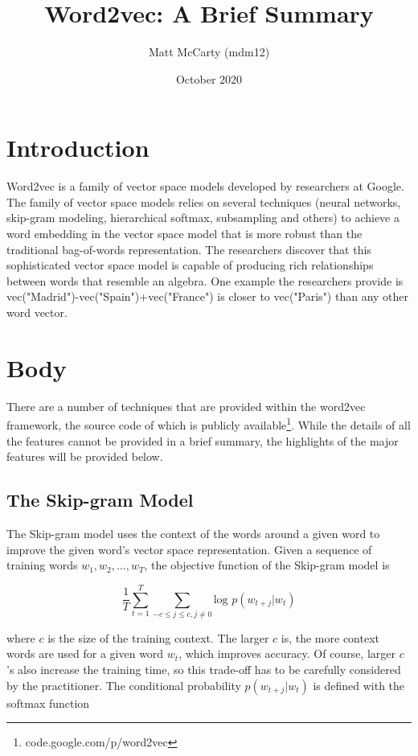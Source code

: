 \documentclass[12pt]{article}
\begin{document}
\title{Word2vec: A Brief Summary}
\author{Matt McCarty (mdm12)}
\date{October 2020}
\maketitle

\section{Introduction}

Word2vec is a family of vector space models developed by researchers at Google.\cite{source1} The family of vector space models relies on several techniques (neural networks, skip-gram modeling, hierarchical softmax, subsampling and others) to achieve a word embedding in the vector space model that is more robust than the traditional bag-of-words representation.\cite{source2} The researchers discover that this sophisticated vector space model is capable of producing rich relationships between words that resemble an algebra. One example the researchers provide is vec("Madrid")-vec("Spain")+vec("France") is closer to vec("Paris") than any other word vector.\cite{source3}

\section{Body}

There are a number of techniques that are provided within the word2vec framework, the source code of which is publicly available\footnote{\label{foot1}code.google.com/p/word2vec}. While the details of all the features cannot be provided in a brief summary, the highlights of the major features will be provided below.

\subsection{The Skip-gram Model}

The Skip-gram model uses the context of the words around a given word to improve the given word's vector space representation. Given a sequence of training words $w_1,w_2, \ldots, w_T$, the objective function of the Skip-gram model is

\[
\frac{1}{T} \sum_{t=1}^{T}\sum_{-c \le j \le c,j \neq 0} \textrm{log }p(w_{t+j}|w_t)
\]

where $c$ is the size of the training context. The larger $c$ is, the more context words are used for a given word $w_t$, which improves accuracy. Of course, larger $c$'s also increase the training time, so this trade-off has to be carefully considered by the practitioner. The conditional probability $p(w_{t+j}|w_t)$ is defined with the softmax function
\end{document}
